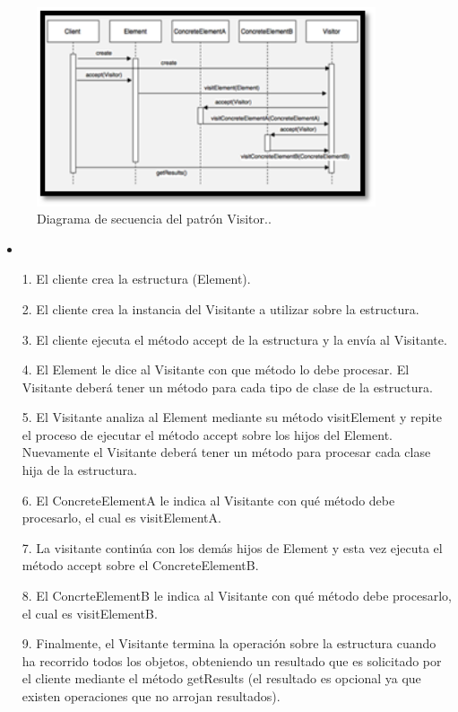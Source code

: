 \documentclass[12pt,letterpaper]{article}
\begin{document}
\begin{figure}[h]
\begin{center}
\includegraphics[width=10cm]{./Imagenes/image3.png}
\caption{Diagrama de secuencia del patrón Visitor..}
\label{rg3}
\end{center}
\end{figure}



\begin{itemize}
\item   
\item [1.] El cliente crea la estructura (Element). 
\item [2.] El cliente crea la instancia del Visitante a utilizar sobre la estructura. 
\item [3.] El cliente ejecuta el método accept de la estructura y la envía al Visitante. 
\item [4.] El Element le dice al Visitante con que método lo debe procesar. El Visitante deberá tener un método para cada tipo de clase de la estructura. 
\item [5.] El Visitante analiza al Element mediante su método visitElement y repite el proceso de ejecutar el método accept sobre los hijos del Element. Nuevamente el Visitante deberá tener un método para procesar cada clase hija de la estructura. 
\item [6.] El ConcreteElementA le indica al Visitante con qué método debe procesarlo, el cual es visitElementA. 
\item [7.] La visitante continúa con los demás hijos de Element y esta vez ejecuta el método accept sobre el ConcreteElementB. 
\item [8.] El ConcrteElementB le indica al Visitante con qué método debe procesarlo, el cual es visitElementB. 
\item [9.] Finalmente, el Visitante termina la operación sobre la estructura cuando ha recorrido todos los objetos, obteniendo un resultado que es solicitado por el cliente mediante el método getResults (el resultado es opcional ya que existen operaciones que no arrojan resultados). 
\end{itemize}
\end{document}
